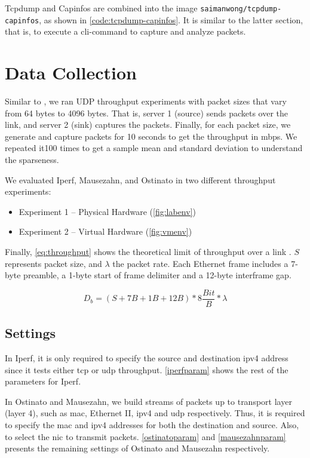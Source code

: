 \skippara Tcpdump and Capinfos are combined into the image \texttt{saimanwong/tcpdump-capinfos}, as shown in \cref{code:tcpdump-capinfos}.
It is similar to the latter section, that is, to execute a \gls{cli}-command to capture and analyze packets.

%
%
\clearpage
\section{Data Collection}\label{section:datacollection}
Similar to \cite{kolahi2011performance, srivastava2014evaluation, srivastava2014comparative}, we ran UDP throughput experiments with packet sizes that vary from 64 bytes to 4096 bytes.
That is, server 1 (source) sends packets over the link, and server 2 (sink) captures the packets.
Finally, for each packet size, we generate and capture packets for 10 seconds to get the throughput in \acrshort{mbps}.
We repeated it100 times to get a sample mean and standard deviation to understand the sparseness.

\skippara We evaluated Iperf, Mausezahn, and Ostinato in two different throughput experiments:
\begin{itemize}
    \item Experiment 1 -- Physical Hardware (\cref{fig:labenv})
    \item Experiment 2 -- Virtual Hardware (\cref{fig:vmenv})
\end{itemize}

\skippara Finally, \cref{eq:throughput} shows the theoretical limit of throughput over a link \cite{meyer2013measurement}.
$S$ represents packet size, and $\lambda$ the packet rate.
Each Ethernet frame includes a 7-byte preamble, a 1-byte start of frame delimiter and a 12-byte interframe gap.

\begin{equation}\label{eq:throughput}
    D_b = (S + 7B + 1B + 12B)*8\frac{Bit}{B}*\lambda
\end{equation}

\subsection{Settings}\label{section:settings}

\skippara In Iperf, it is only required to specify the source and destination \gls{ipv4} address since it tests either \acrshort{tcp} or \acrshort{udp} throughput.
\cref{iperfparam} shows the rest of the parameters for Iperf.

\skippara In Ostinato and Mausezahn, we build streams of packets up to transport layer (layer 4), such as \gls{mac}, Ethernet II, \gls{ipv4} and \gls{udp} respectively.
Thus, it is required to specify the \gls{mac} and \gls{ipv4} addresses for both the destination and source.
Also, to select the \gls{nic} to transmit packets.
\cref{ostinatoparam} and \cref{mausezahnparam} presents the remaining settings of Ostinato and Mausezahn respectively.







